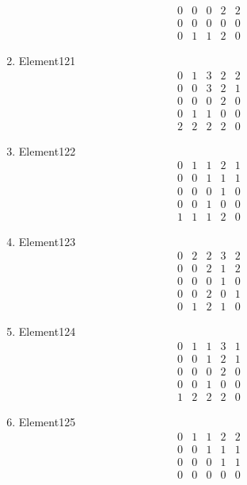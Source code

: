 \documentclass[12pt]{article}
\begin{document}
\begin{multicols}{3}
\begin{enumerate}
\begin{equation*}
\begin{array}{ccccc}
0&0&0&2&2\\
0&0&0&0&0\\
0&1&1&2&0
\end{array}
\end{equation*}
\item Element121
\begin{equation*}
\begin{array}{ccccc}
0&1&3&2&2\\
0&0&3&2&1\\
0&0&0&2&0\\
0&1&1&0&0\\
2&2&2&2&0
\end{array}
\end{equation*}
\item Element122
\begin{equation*}
\begin{array}{ccccc}
0&1&1&2&1\\
0&0&1&1&1\\
0&0&0&1&0\\
0&0&1&0&0\\
1&1&1&2&0
\end{array}
\end{equation*}
\item Element123
\begin{equation*}
\begin{array}{ccccc}
0&2&2&3&2\\
0&0&2&1&2\\
0&0&0&1&0\\
0&0&2&0&1\\
0&1&2&1&0
\end{array}
\end{equation*}
\item Element124
\begin{equation*}
\begin{array}{ccccc}
0&1&1&3&1\\
0&0&1&2&1\\
0&0&0&2&0\\
0&0&1&0&0\\
1&2&2&2&0
\end{array}
\end{equation*}
\item Element125
\begin{equation*}
\begin{array}{ccccc}
0&1&1&2&2\\
0&0&1&1&1\\
0&0&0&1&1\\
0&0&0&0&0\\

\end{array}
\end{equation*}
\end{enumerate}
\end{multicols}
\end{document}
